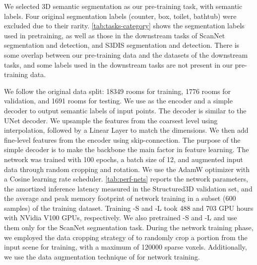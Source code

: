 \documentclass[10pt,twocolumn,letterpaper]{article}
\begin{document}
 We selected 3D semantic segmentation as our pre-training task, with  semantic labels. Four original segmentation labels (counter, box, toilet, bathtub) were excluded due to their rarity. \cref{tab:tasks-category} shows the segmentation labels used in pretraining, as well as those in the downstream tasks of ScanNet segmentation and detection, and S3DIS segmentation and detection. There is some overlap between our pre-training data and the datasets of the downstream tasks, and some labels used in the downstream tasks are not present in our pre-training data.

We follow the original data split: 18349 rooms for training, 1776 rooms for validation, and 1691 rooms for testing. We use {\SST} as the encoder and a simple decoder to output semantic labels of input points. The decoder is similar to the UNet decoder. We upsample the features from the coarsest level using interpolation, followed by a Linear Layer to match the dimensions. We then add fine-level features from the encoder using skip-connection. The purpose of the simple decoder is to make the backbone the main factor in feature learning. The network was trained with 100 epochs, a batch size of 12, and augmented input data through random cropping and rotation. We use the AdamW optimizer with a Cosine learning rate scheduler. \cref{tab:perf-nets} reports the network parameters, the amortized inference latency measured in the Structured3D validation set, and the average and peak memory footprint of network training in a subset (600 samples) of the training dataset. Training \SST-S and \SST-L took 488 and 703 GPU hours with NVidia V100 GPUs, respectively. We also pretrained {\SST}-S and {\SST}-L and use them only for the ScanNet segmentation task.
 During the network training phase, we employed the data cropping strategy of \cite{lai2022stratified} to randomly crop a portion from the input scene for training, with a maximum of \num{120000} sparse voxels. Additionally, we use the data augmentation technique of \cite{lai2022stratified} for network training.
\end{document}
